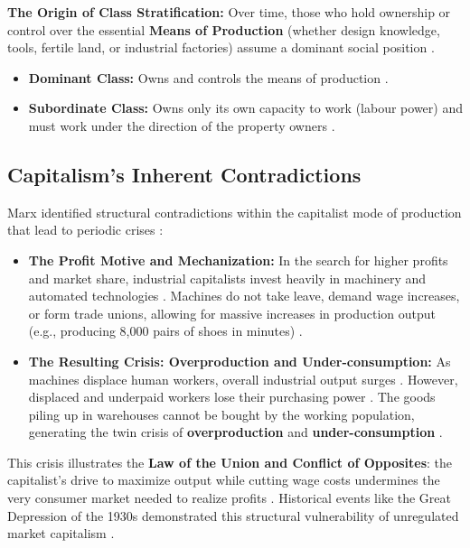\begin{KeyConcept}
\textbf{The Origin of Class Stratification:}
Over time, those who hold ownership or control over the essential \textbf{Means of Production} (whether design knowledge, tools, fertile land, or industrial factories) assume a dominant social position .
\begin{itemize}
    \item \textbf{Dominant Class:} Owns and controls the means of production .
    \item \textbf{Subordinate Class:} Owns only its own capacity to work (labour power) and must work under the direction of the property owners .
\end{itemize}
\end{KeyConcept}

\subsection{Capitalism's Inherent Contradictions}

Marx identified structural contradictions within the capitalist mode of production that lead to periodic crises :
\begin{itemize}
    \item \textbf{The Profit Motive and Mechanization:} In the search for higher profits and market share, industrial capitalists invest heavily in machinery and automated technologies . Machines do not take leave, demand wage increases, or form trade unions, allowing for massive increases in production output (e.g., producing 8,000 pairs of shoes in minutes) .
    \item \textbf{The Resulting Crisis: Overproduction and Under-consumption:}
    As machines displace human workers, overall industrial output surges . However, displaced and underpaid workers lose their purchasing power . The goods piling up in warehouses cannot be bought by the working population, generating the twin crisis of \textbf{overproduction} and \textbf{under-consumption} .
\end{itemize}

\begin{CriticalPoint}
This crisis illustrates the \textbf{Law of the Union and Conflict of Opposites}: the capitalist's drive to maximize output while cutting wage costs undermines the very consumer market needed to realize profits . Historical events like the Great Depression of the 1930s demonstrated this structural vulnerability of unregulated market capitalism .
\end{CriticalPoint}

